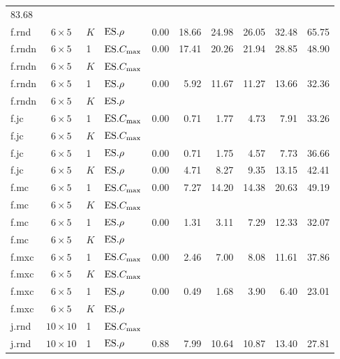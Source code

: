\begin{table}[b]
{\begin{tabular}{lcllrrrrrr}
83.68 \\ 
f.rnd & $6\times5$ & $K$ & $\text{ES}.{\rho}$ & 0.00 & 18.66 & 24.98 & 26.05 & 32.48 & 
65.75 \\ 
\hline
f.rndn & $6\times5$ & 1 & $\text{ES}.{C_{\max}}$ & 0.00 & 17.41 & 20.26 & 21.94 & 28.85 & 
48.90 \\ 
f.rndn & $6\times5$ & $K$ & $\text{ES}.{C_{\max}}$ & & & & & & \\
f.rndn & $6\times5$ & 1 & $\text{ES}.{\rho}$ & 0.00 & 5.92 & 11.67 & 11.27 & 13.66 & 
32.36 \\ 
f.rndn & $6\times5$ & $K$ & $\text{ES}.{\rho}$ & & & & & & \\
\hline
f.jc & $6\times5$ & 1 & $\text{ES}.{C_{\max}}$ & 0.00 & 0.71 & 1.77 & 4.73 & 7.91 & 33.26 
\\ 
f.jc & $6\times5$ & $K$ & $\text{ES}.{C_{\max}}$ & & & & & & \\
f.jc & $6\times5$ & 1 & $\text{ES}.{\rho}$ & 0.00 & 0.71 & 1.75 & 4.57 & 7.73 & 36.66 \\ 
f.jc & $6\times5$ & $K$ & $\text{ES}.{\rho}$ & 0.00 & 4.71 & 8.27 & 9.35 & 13.15 & 42.41 
\\ 
\hline
f.mc & $6\times5$ & 1 & $\text{ES}.{C_{\max}}$ & 0.00 & 7.27 & 14.20 & 14.38 & 20.63 & 
49.19 \\ 
f.mc & $6\times5$ & $K$ & $\text{ES}.{C_{\max}}$ & & & & & & \\
f.mc & $6\times5$ & 1 & $\text{ES}.{\rho}$ & 0.00 & 1.31 & 3.11 & 7.29 & 12.33 & 32.07 
\\ 
f.mc & $6\times5$ & $K$ & $\text{ES}.{\rho}$ & & & & & & \\
\hline
f.mxc & $6\times5$ & 1 & $\text{ES}.{C_{\max}}$ & 0.00 & 2.46 & 7.00 & 8.08 & 11.61 & 37.86 
\\ 
f.mxc & $6\times5$ & $K$ & $\text{ES}.{C_{\max}}$ & & & & & & \\
f.mxc & $6\times5$ & 1 & $\text{ES}.{\rho}$ & 0.00 & 0.49 & 1.68 & 3.90 & 6.40 & 23.01 
\\ 
f.mxc & $6\times5$ & $K$ & $\text{ES}.{\rho}$ & & & & & & \\
\hline
j.rnd & $10\times10$ & 1 & $\text{ES}.{C_{\max}}$ & & & & & & \\
j.rnd & $10\times10$ & 1 & $\text{ES}.{\rho}$ & 0.88 & 7.99 & 10.64 & 10.87 & 13.40 & 
27.81 \\ 
\bottomrule
\end{tabular}}
\end{table}


